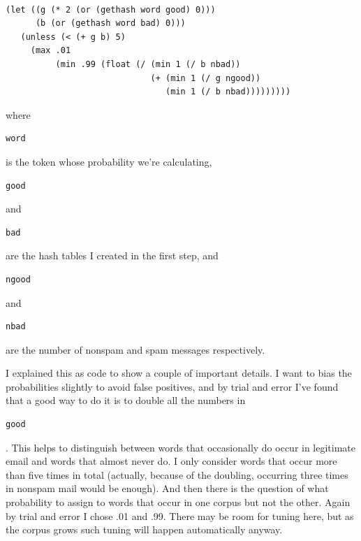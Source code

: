 \begin{verbatim}

(let ((g (* 2 (or (gethash word good) 0)))
      (b (or (gethash word bad) 0)))
   (unless (< (+ g b) 5)
     (max .01
          (min .99 (float (/ (min 1 (/ b nbad))
                             (+ (min 1 (/ g ngood))   
                                (min 1 (/ b nbad)))))))))
\end{verbatim}

where

\begin{verbatim}
word
\end{verbatim}

is the token whose probability we're calculating,

\begin{verbatim}
good
\end{verbatim}

and

\begin{verbatim}
bad
\end{verbatim}

are the hash tables I created in the first step, and

\begin{verbatim}
ngood
\end{verbatim}

and

\begin{verbatim}
nbad
\end{verbatim}

are the number of nonspam and spam messages respectively.

I explained this as code to show a couple of important details. I want
to bias the probabilities slightly to avoid false positives, and by
trial and error I've found that a good way to do it is to double all the
numbers in

\begin{verbatim}
good
\end{verbatim}

. This helps to distinguish between words that occasionally do occur in
legitimate email and words that almost never do. I only consider words
that occur more than five times in total (actually, because of the
doubling, occurring three times in nonspam mail would be enough). And
then there is the question of what probability to assign to words that
occur in one corpus but not the other. Again by trial and error I chose
.01 and .99. There may be room for tuning here, but as the corpus grows
such tuning will happen automatically anyway.

